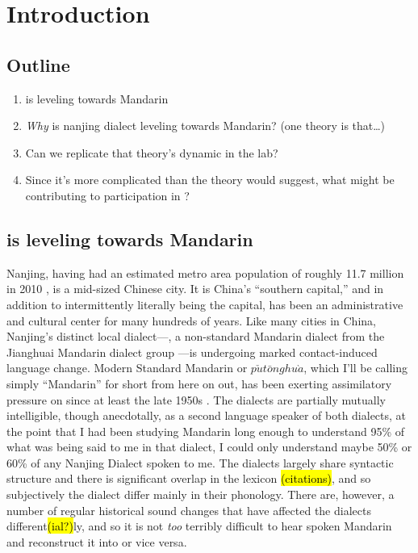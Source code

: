 \chapter{Introduction}
\label{introchap}

\section{Outline}
\begin{enumerate}
    \item \ND{} is leveling towards Mandarin
    \item \emph{Why} is nanjing dialect leveling towards Mandarin? (one theory is that\ldots{})
    \item Can we replicate that theory's dynamic in the lab?
    \item Since it's more complicated than the theory would suggest, what might be contributing to participation in \lta{}?
\end{enumerate}

\section{\ND{} is leveling towards Mandarin}
    Nanjing, having had an estimated metro area population of roughly 11.7 million in 2010 \citep{oecd2015china}, is a mid-sized Chinese city. It is China's ``southern capital,'' and in addition to intermittently literally being the capital, has been an administrative and cultural center for many hundreds of years. Like many cities in China, Nanjing's distinct local dialect---\ND{}, a non-standard Mandarin dialect from the Jianghuai Mandarin dialect group \citep[p.179]{xu2006nanjing}---is undergoing marked contact-induced language change. Modern Standard Mandarin or $p\check{u}t\bar{o}nghu\grave{a}$, which I'll be calling simply ``Mandarin'' for short from here on out, has been exerting assimilatory pressure on \ND{} since at least the late 1950s \citep{bao1980sixty}. The dialects are partially mutually intelligible, though anecdotally, as a second language speaker of both dialects, at the point that I had been studying Mandarin long enough to understand 95\% of what was being said to me in that dialect, I could only understand maybe 50\% or 60\% of any Nanjing Dialect spoken to me. The dialects largely share syntactic structure and there is significant overlap in the lexicon \hl{(citations)}, and so subjectively the dialect differ mainly in their phonology. There are, however, a number of regular historical sound changes that have affected the dialects different\hl{(ial?)}ly, and so it is not \emph{too} terribly difficult to hear spoken Mandarin and reconstruct it into \ND{} or vice versa.
    
